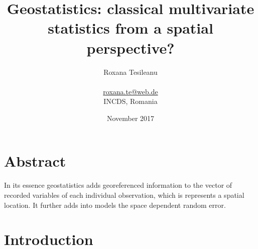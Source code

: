 \documentclass {article}
\title {Geostatistics: classical multivariate statistics from a spatial perspective?}
\date {November 2017}
\author {Roxana Tesileanu \\
\\
\href{mailto: roxana.te@web.de}{roxana.te@web.de} \\
INCDS, Romania}
\begin{document}
        \maketitle

\tableofcontents


\section {Abstract}

In its essence geostatistics adds georeferenced information to the vector of recorded variables of each individual observation, which is represents a spatial location. It further adds into models the space dependent random error.   

\section {Introduction}
\end{document}
